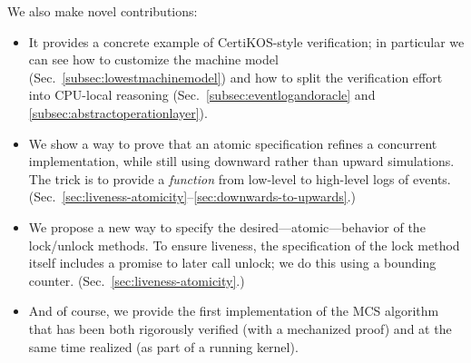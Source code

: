We also make novel contributions:


\begin{itemize}
\item It provides a concrete example of CertiKOS-style verification; in particular we can see how to customize the machine model (Sec.~\ref{subsec:lowestmachinemodel}) and how to split the verification effort into CPU-local reasoning (Sec.~\ref{subsec:eventlogandoracle} and \ref{subsec:abstractoperationlayer}).
  
\item We show a way to prove that an atomic specification refines a concurrent implementation, while still using downward rather than upward simulations. The trick is to provide a \emph{function} from low-level to high-level logs of events. (Sec.~\ref{sec:liveness-atomicity}--\ref{sec:downwards-to-upwards}.)

\item We propose a new way to specify the desired---atomic---behavior of the lock/unlock methods. To ensure liveness, the specification of the lock method itself includes a promise to later call unlock; we do this using a bounding counter. (Sec.~\ref{sec:liveness-atomicity}.)

\item And of course, we provide the first implementation of the MCS algorithm that has been both rigorously verified (with a mechanized proof) and at the same time realized (as part of a running kernel).
\end{itemize}


